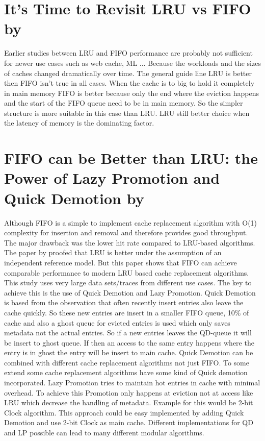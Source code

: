 \documentclass[
	12pt,
	a4paper,
	abstract,
	bibliography=totoc,
	chapterprefix,
	headings=openright,
	numbers=endperiod,
	parskip=half,
	twoside,
]{scrreprt}
\begin{document}
\section*{It's Time to Revisit LRU vs FIFO by \cite{eytan2020s}}

Earlier studies between LRU and FIFO performance are probably not sufficient for newer use cases such as web cache, ML ...
Because the workloads and the sizes of caches changed dramatically over time.
The general guide line LRU is better then FIFO isn't true in all cases.
When the cache is to big to hold it completely in main memory FIFO is better because only the end where the eviction happens and the start of the FIFO queue need to be in main memory. So the simpler structure is more suitable in this case than LRU.
LRU still better choice when the latency of memory is the dominating factor.

\section*{FIFO can be Better than LRU: the Power of Lazy Promotion and Quick Demotion by \cite{yang2023fifo}}

Although FIFO is a simple to implement cache replacement algorithm with O(1) complexity for insertion and removal and therefore provides good throughput.
The major drawback was the lower hit rate compared to LRU-based algorithms.
The paper by \cite{van1992lru} proofed that LRU is better under the assumption of an independent reference model.
But this paper \cite{yang2023fifo} shows that FIFO can achieve comparable performance to modern LRU based cache replacement algorithms.
This study uses very large data sets/traces from different use cases.
The key to achieve this is the use of Quick Demotion and Lazy Promotion.
Quick Demotion is based from the observation that often recently insert entries also leave the cache quickly. So these new entries are insert in a smaller FIFO queue, 10\% of cache and also a ghost queue for evicted entries is used which only saves metadata not the actual entries. So if a new entries leaves the QD-queue it will be insert to ghost queue. If then an access to the same entry happens where the entry is in ghost the entry will be insert to main cache.
Quick Demotion can be combined with different cache replacement algorithms not just FIFO.
To some extend some cache replacement algorithms have some kind of  Quick demotion incorporated. 
Lazy Promotion tries to maintain hot entries in cache with minimal overhead.
To achieve this Promotion only happens at eviction not at access like LRU which decrease the handling of metadata. Example for this would be 2-bit Clock algorithm.
This approach could be easy implemented by adding Quick Demotion and use 2-bit Clock as main cache.
Different implementations for QD and LP possible can lead to many different modular algorithms. 
\end{document}
